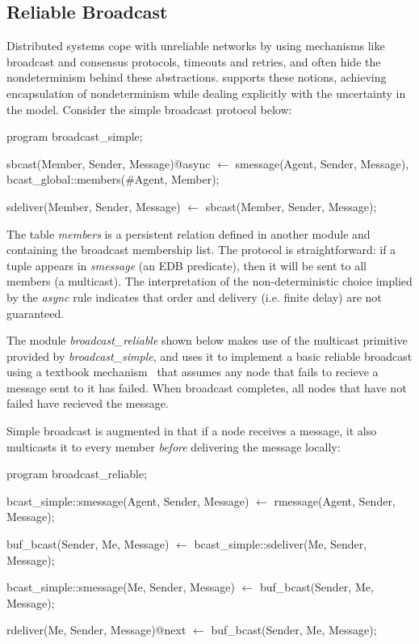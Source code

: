 \subsection{Reliable Broadcast}
Distributed systems cope with unreliable networks by using mechanisms like broadcast and consensus protocols, 
timeouts and retries, and often hide the nondeterminism behind these abstractions.  \lang supports these notions,
achieving encapsulation of nondeterminism while dealing explicitly with the uncertainty in the model.  Consider the simple
broadcast protocol below:


\begin{Dedalus}

program broadcast_simple;

sbcast(Member, Sender, Message)@async \(\leftarrow\)
    smessage(Agent, Sender, Message),
    bcast_global::members(#Agent, Member);

sdeliver(Member, Sender, Message) \(\leftarrow\)
    sbcast(Member, Sender, Message);

\end{Dedalus}

The table \emph{members} is a persistent relation defined in another module  and containing the broadcast 
membership list.  
The protocol is straightforward: if a tuple appears in \emph{smessage} (an EDB predicate), then
it will be sent to all members (a multicast).  The interpretation of the non-deterministic choice implied by the
\emph{async} rule indicates that order and delivery (i.e. finite delay) are not guaranteed.

The module \emph{broadcast\_reliable} shown below makes use of the
multicast primitive provided by \emph{broadcast\_simple}, and uses it
to implement a basic reliable broadcast using a textbook
mechanism~\cite{mullender} that assumes any node that fails to recieve
a message sent to it has failed.  When broadcast completes, all nodes
that have not failed have recieved the message.

Simple broadcast is augmented in that if a node receives a message, it 
also multicasts it to every member \emph{before} delivering the message locally:

\begin{Dedalus}
program broadcast_reliable;

bcast_simple::smessage(Agent, Sender, Message)  \(\leftarrow\)
    rmessage(Agent, Sender, Message);

buf_bcast(Sender, Me, Message)  \(\leftarrow\)
    bcast_simple::sdeliver(Me, Sender, Message);

bcast_simple::smessage(Me, Sender, Message)  \(\leftarrow\)
    buf_bcast(Sender, Me, Message);

rdeliver(Me, Sender, Message)@next  \(\leftarrow\)
    buf_bcast(Sender, Me, Message);

\end{Dedalus}

